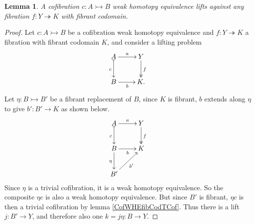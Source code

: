 \documentclass[11pt]{amsart}
\newcommand{\mono}{\ensuremath{\rightarrowtail}}
\newcommand{\ra}{\ensuremath{\rightarrow}}
\newcommand{\onto}{\ensuremath{\twoheadrightarrow}}
\newtheorem{lemma}[theorem]{Lemma}
\theoremstyle{remark}
\theoremstyle{definition}
\begin{document}
\begin{lemma}\label{lemma:CofWHEiffFibLift}
A cofibration $ c : A \mono B$ weak homotopy equivalence lifts against  any fibration $f : Y\onto K$ with fibrant codomain.
\end{lemma}
%
\begin{proof}
Let $c : A\mono B$ be a cofibration weak homotopy equivalence and  $f : Y\onto K$ a fibration with fibrant codomain $K$, and consider a lifting problem
\begin{equation*}%
\xymatrix{
A \ar@{>->}[d]_{c} \ar[r]^-{a}  & Y \ar@{>>}[d]^{f} \\
B \ar[r]_{b} &  K.
}
\end{equation*}
Let $\eta : B\mono B'$ be a fibrant replacement of $B$, since $K$ is fibrant, $b$ extends along $\eta$ to give $b' : B'\ra K$ as shown below.   
\begin{equation*}%
\xymatrix{
A \ar@{>->}[d]_{c} \ar[r]^-{a}  & Y \ar@{>>}[d]^{f} \\
B \ar[r]_{b} \ar[d]_\eta &  K\\
B' \ar[ru]_{b'} & 
}
\end{equation*}
Since $\eta$ is a trivial cofibration, it is a weak homotopy equivalence. So the composite $\eta c$ is also a weak homotopy equivalence.  But since $B'$ is fibrant, $\eta c$ is then a trivial cofibration by lemma \ref{CofWHEfibCodTCof}.  Thus there is a lift $j : B'\ra Y$, and therefore also one $k = j\eta : B\ra Y$. 
%
\end{proof}
\end{document}
